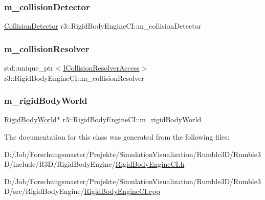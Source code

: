 \subsubsection{\texorpdfstring{m\+\_\+collision\+Detector}{m\_collisionDetector}}
{\footnotesize\ttfamily \mbox{\hyperlink{classr3_1_1_collision_detector}{Collision\+Detector}} r3\+::\+Rigid\+Body\+Engine\+C\+I\+::m\+\_\+collision\+Detector\hspace{0.3cm}{\ttfamily [protected]}}

\mbox{\label{classr3_1_1_rigid_body_engine_c_i_a27f09a82ab77919c2fb78869f6d3c035}} 
\subsubsection{\texorpdfstring{m\+\_\+collision\+Resolver}{m\_collisionResolver}}
{\footnotesize\ttfamily std\+::unique\+\_\+ptr$<$\mbox{\hyperlink{classr3_1_1_i_collision_resolver_access}{I\+Collision\+Resolver\+Access}}$>$ r3\+::\+Rigid\+Body\+Engine\+C\+I\+::m\+\_\+collision\+Resolver\hspace{0.3cm}{\ttfamily [protected]}}

\mbox{\label{classr3_1_1_rigid_body_engine_c_i_afd7ae3fcba8b88ec6c31f2df56aae3f6}} 
\subsubsection{\texorpdfstring{m\+\_\+rigid\+Body\+World}{m\_rigidBodyWorld}}
{\footnotesize\ttfamily \mbox{\hyperlink{classr3_1_1_rigid_body_world}{Rigid\+Body\+World}}$\ast$ r3\+::\+Rigid\+Body\+Engine\+C\+I\+::m\+\_\+rigid\+Body\+World\hspace{0.3cm}{\ttfamily [protected]}}



The documentation for this class was generated from the following files\+:\begin{DoxyCompactItemize}
\item 
D\+:/\+Job/\+Forschungsmaster/\+Projekte/\+Simulation\+Visualization/\+Rumble3\+D/\+Rumble3\+D/include/\+R3\+D/\+Rigid\+Body\+Engine/\mbox{\hyperlink{_rigid_body_engine_c_i_8h}{Rigid\+Body\+Engine\+C\+I.\+h}}\item 
D\+:/\+Job/\+Forschungsmaster/\+Projekte/\+Simulation\+Visualization/\+Rumble3\+D/\+Rumble3\+D/src/\+Rigid\+Body\+Engine/\mbox{\hyperlink{_rigid_body_engine_c_i_8cpp}{Rigid\+Body\+Engine\+C\+I.\+cpp}}\end{DoxyCompactItemize}
